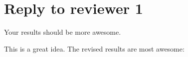 \documentclass[10pt]{replyltr}
\begin{document}
\section{Reply to reviewer 1}
\reviewer
Your results should be more awesome.

\reply
This is a great idea. The revised results are most awesome:


	

		
\end{document}
